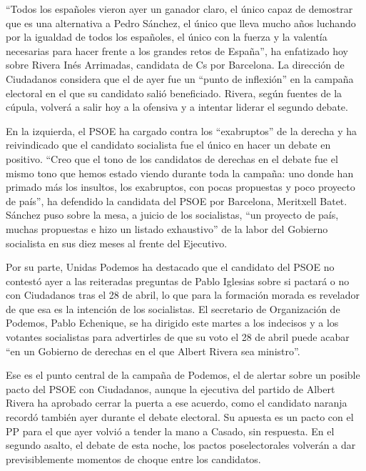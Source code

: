 ``Todos los españoles vieron ayer un ganador claro, el único capaz de demostrar que es una alternativa a Pedro Sánchez, el único que lleva mucho años luchando por la igualdad de todos los españoles, el único con la fuerza y la valentía necesarias para hacer frente a los grandes retos de España'', ha enfatizado hoy sobre Rivera Inés Arrimadas, candidata de Cs por Barcelona. La dirección de Ciudadanos considera que el de ayer fue un ``punto de inflexión'' en la campaña electoral en el que su candidato salió beneficiado. Rivera, según fuentes de la cúpula, volverá a salir hoy a la ofensiva y a intentar liderar el segundo debate.

En la izquierda, el PSOE ha cargado contra los ``exabruptos'' de la derecha y ha reivindicado que el candidato socialista fue el único en hacer un debate en positivo. ``Creo que el tono de los candidatos de derechas en el debate fue el mismo tono que hemos estado viendo durante toda la campaña: uno donde han primado más los insultos, los exabruptos, con pocas propuestas y poco proyecto de país'', ha defendido la candidata del PSOE por Barcelona, Meritxell Batet. Sánchez puso sobre la mesa, a juicio de los socialistas, ``un proyecto de país, muchas propuestas e hizo un listado exhaustivo'' de la labor del Gobierno socialista en sus diez meses al frente del Ejecutivo.

Por su parte, Unidas Podemos ha destacado que el candidato del PSOE no contestó ayer a las reiteradas preguntas de Pablo Iglesias sobre si pactará o no con Ciudadanos tras el 28 de abril, lo que para la formación morada es revelador de que esa es la intención de los socialistas. El secretario de Organización de Podemos, Pablo Echenique, se ha dirigido este martes a los indecisos y a los votantes socialistas para advertirles de que su voto el 28 de abril puede acabar ``en un Gobierno de derechas en el que Albert Rivera sea ministro''.

Ese es el punto central de la campaña de Podemos, el de alertar sobre un posible pacto del PSOE con Ciudadanos, aunque la ejecutiva del partido de Albert Rivera ha aprobado cerrar la puerta a ese acuerdo, como el candidato naranja recordó también ayer durante el debate electoral. Su apuesta es un pacto con el PP para el que ayer volvió a tender la mano a Casado, sin respuesta. En el segundo asalto, el debate de esta noche, los pactos poselectorales volverán a dar previsiblemente momentos de choque entre los candidatos.